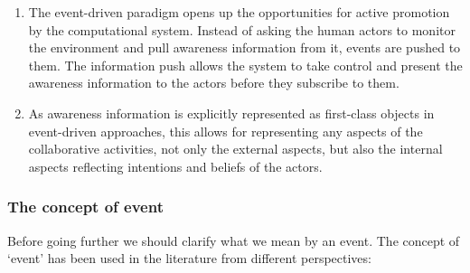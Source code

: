 \begin{enumerate}
   \item The event-driven paradigm opens up the opportunities for active promotion by the computational system. Instead of asking the human actors to monitor the environment and pull awareness information from it, events are pushed to them. The information push allows the system to take control and present the awareness information to the actors before they subscribe to them.
   \item As awareness information is explicitly represented as first-class objects in event-driven approaches, this allows for representing any aspects of the collaborative activities, not only the external aspects, but also the internal aspects reflecting intentions and beliefs of the actors.
\end{enumerate}

\subsubsection{The concept of event} %
\label{ssub:the_concept_of_events}
Before going further we should clarify what we mean by an event. The concept of `event' has been used in the literature from different perspectives:

